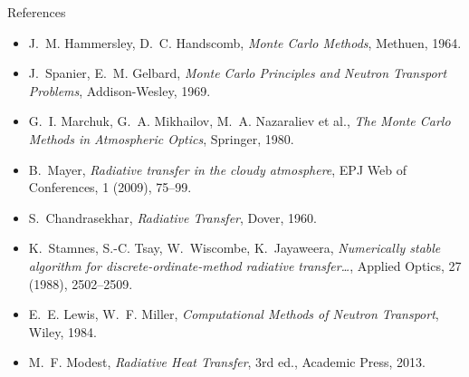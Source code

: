 \documentclass[aspectratio=169,10pt]{beamer}
\begin{document}
\begin{frame}{References}
\footnotesize
\begin{itemize}\itemsep3pt
\item J.~M. Hammersley, D.~C. Handscomb, {\em Monte Carlo Methods}, Methuen, 1964.
\item J.~Spanier, E.~M. Gelbard, {\em Monte Carlo Principles and Neutron Transport
Problems}, Addison-Wesley, 1969.
\item G.~I. Marchuk, G.~A. Mikhailov, M.~A. Nazaraliev et al., {\em The Monte Carlo
Methods in Atmospheric Optics}, Springer, 1980.
\item B.~Mayer, {\em Radiative transfer in the cloudy atmosphere}, EPJ Web of Conferences,
1 (2009), 75--99.
\item S.~Chandrasekhar, {\em Radiative Transfer}, Dover, 1960.
\item K.~Stamnes, S.-C. Tsay, W.~Wiscombe, K.~Jayaweera, {\em Numerically stable algorithm
for discrete-ordinate-method radiative transfer\dots}, Applied Optics, 27 (1988),
2502--2509.
\item E.~E. Lewis, W.~F. Miller, {\em Computational Methods of Neutron Transport}, Wiley,
1984.
\item M.~F. Modest, {\em Radiative Heat Transfer}, 3rd ed., Academic Press, 2013.
\end{itemize}
\end{frame}
\end{document}
